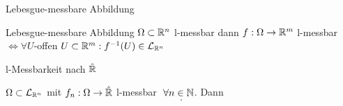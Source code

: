 \documentclass[class=article, crop=false]{standalone}
\begin{document}
\begin{zettel}{Lebesgue-messbare Abbildung}
\begin{flashcard}[hrmgcfyt]{Lebesgue-messbare Abbildung}
	$\Omega \subset \mathbb{R}^n$ l-messbar dann $f: \Omega \to  \mathbb{R}^m$ l-messbar $\iff  \forall U$-offen $U \subset  \mathbb{R}^m : f^{-1}(U) \in  \mathcal{L}_{\mathbb{R}^n }$
\end{flashcard}

\begin{flashcard}[ntxn0g6x]{l-Messbarkeit nach $\hat{\mathbb{R} }$}
	\begin{definition}
		$\Omega \subset \mathcal{L}_{ \mathbb{R}^n }$ mit $f_n : \Omega \to  \hat{\mathbb{R} }$ l-messbar $\forall n \in \N $. Dann
		\[

		.\]
	\end{definition}
\end{flashcard}
\end{zettel}
\end{document}

